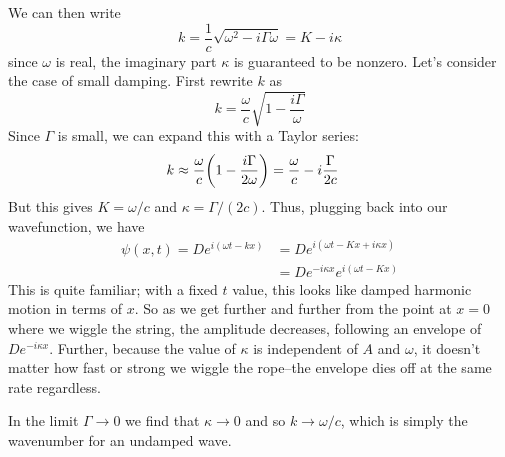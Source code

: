 We can then write
\[ k = \frac{1}{c}\sqrt{\omega^2-i\Gamma \omega} = K-i\kappa \]
since $\omega$ is real, the imaginary part $\kappa$ is guaranteed to be nonzero. Let's consider the case of small damping. First rewrite $k$ as
\[ k = \frac{\omega}{c}\sqrt{1 - \frac{i\Gamma}{\omega}}\]
Since $\Gamma$ is small, we can expand this with a Taylor series:
\begin{align*}
    k &\approx \frac{\omega}{c}\pqty{1 - \frac{i\Gamma}{2\omega}} = \frac{\omega}{c} - i\frac{\Gamma}{2c}
\end{align*}
But this gives $K = \omega/c$ and $\kappa = \Gamma/(2c)$. Thus, plugging back into our wavefunction, we have
\begin{align*}
    \psi(x,t) = De^{i(\omega t-kx)} &= De^{i(\omega t -Kx + i\kappa x)} \\
    &= De^{-i\kappa x}e^{i(\omega t-Kx)}
\end{align*}
This is quite familiar; with a fixed $t$ value, this looks like damped harmonic motion in terms of $x$. So as we get further and further from the point at $x=0$ where we wiggle the string, the amplitude decreases, following an envelope of $De^{-i\kappa x}$. Further, because the value of $\kappa$ is independent of $A$ and $\omega$, it doesn't matter how fast or strong we wiggle the rope--the envelope dies off at the same rate regardless.

In the limit $\Gamma\to 0$ we find that $\kappa \to 0$ and so $k\to \omega/c$, which is simply the wavenumber for an undamped wave.


